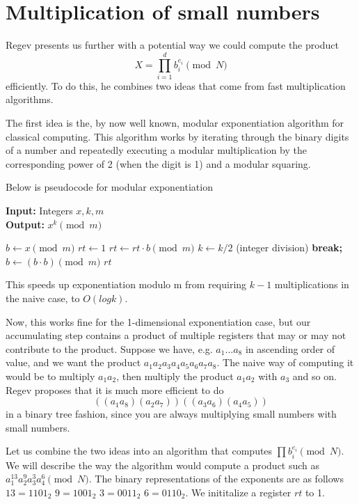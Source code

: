 \chapter{Multiplication of small numbers}


Regev presents us further with a potential way we could compute the product $$X =\prod_{i=1}^d b_i^{e_i} \pmod N$$ efficiently. To do this, he combines two ideas that come from fast multiplication algorithms.

The first idea is the, by now well known, modular exponentiation algorithm for classical computing. This algorithm works by iterating through the binary digits of a number and repeatedly executing a modular multiplication by the corresponding power of 2 (when the digit is 1) and a modular squaring.

Below is pseudocode for modular exponentiation

\begin{algorithm}[H]
\caption{Modular Exponentiation}
\textbf{Input:} Integers $x,k,m$ \\
\textbf{Output:} $x^k \pmod m$
\begin{algorithmic}[1]
\State $b \gets x \pmod m$
\State $rt \gets 1$
        $rt \gets rt \cdot b \pmod m$
    \EndIf
    \State $k \gets k /2$ (integer division)
        \State \textbf{break;}
    \EndIf
    \State $b \gets (b \cdot b) \pmod m$
\EndWhile
\State \Return $rt$
\end{algorithmic}
\end{algorithm}

This speeds up exponentiation modulo m from requiring $k-1$ multiplications in the naive case, to $O(logk)$.

Now, this works fine for the 1-dimensional exponentiation case, but our accumulating step contains a product of multiple registers that may or may not contribute to the product. Suppose we have, e.g. $a_1\dots a_8$ in ascending order of value, and we want the product $a_1a_2a_3a_4a_5a_6a_7a_8$. The naive way of computing it would be to multiply $a_1a_2$, then multiply the  product $a_1a_2$ with $a_3$ and so on. Regev proposes that it is much more efficient to do $$((a_1a_8)(a_2a_7))((a_3a_6)(a_4a_5))$$ in a binary tree fashion, since you are always multiplying small numbers with small numbers.

Let us combine the two ideas into an algorithm that computes $\prod{b_i^{e_i}} \pmod N$.
We will describe the way the algorithm would compute a product such as $a_1^{13} a_2^9 a_3^3 a_4^6 \pmod N$. The binary representations of the exponents are as follows $13 = 1101_2$ $9 = 1001_2$ $3 = 0011_2$ $6 = 0110_2$. We inititalize a register $rt$ to 1.\\

